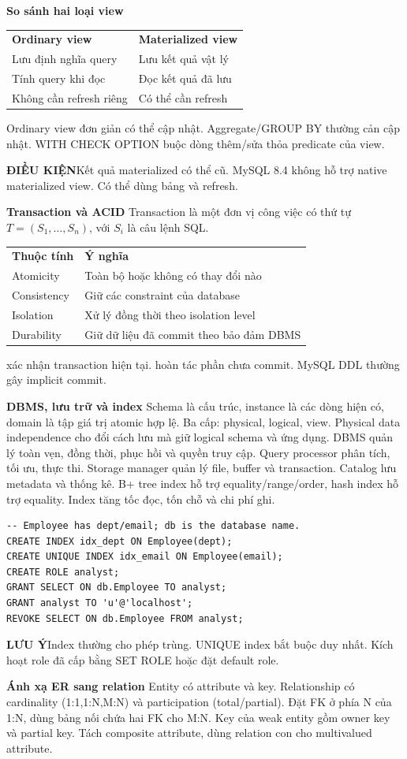 \documentclass[a4paper]{article}
\newcommand{\sqlfont}{\ttfamily}
\newcommand{\bodyfontsize}{5.55}
\newcommand{\bodyleading}{5.2}
\newcommand{\bodylineskiplimit}{-2pt}
\newcommand{\bodystyle}{%
  \fontsize{\bodyfontsize}{\bodyleading}\selectfont\setlength{\lineskiplimit}{\bodylineskiplimit}\RaggedRight
  \setlength{\abovedisplayskip}{.5pt}\setlength{\belowdisplayskip}{.5pt}%
  \setlength{\abovedisplayshortskip}{.3pt}\setlength{\belowdisplayshortskip}{.3pt}}
\newenvironment{topicblock}
  {\par\bodystyle}
  {\par}
\newcommand{\key}[1]{\par\textcolor{structure}{\textbf{#1}}\enspace}
\newcommand{\note}[4]{\par\nointerlineskip\vspace{.25pt}\begingroup\setlength{\fboxsep}{0.1pt}%
  \noindent\colorbox{#1}{\parbox{\dimexpr\linewidth-2\fboxsep\relax}{%
    \RaggedRight\textcolor{#2}{\textbf{#3}}\enspace #4}}%
  \endgroup\par\nointerlineskip\vspace{.25pt}}
\newcommand{\cond}[1]{\note{conditionbg}{condition}{ĐIỀU KIỆN}{#1}}
\newcommand{\trap}[1]{\note{warningbg}{warning}{LƯU Ý}{#1}}
\newcommand{\sql}[1]{{\sqlfont\color{sqltext}\detokenize{#1}}}
\newlength{\sheetwidth}
\newenvironment{sheetcolumns}[1]
  {\noindent\begin{minipage}[t]{#1\sheetwidth}\vspace{0pt}\bodystyle\ignorespaces}
  {\end{minipage}\par}
\begin{document}
\begin{sheetcolumns}{.258}
\begin{topicblock}
\key{So sánh hai loại view}
\par\begingroup\setlength{\tabcolsep}{1.4pt}
\begin{tabular}{@{}ll@{}}
\textbf{Ordinary view} & \textbf{Materialized view}\\
Lưu định nghĩa query & Lưu kết quả vật lý\\
Tính query khi đọc & Đọc kết quả đã lưu\\
Không cần refresh riêng & Có thể cần refresh
\end{tabular}\endgroup\par
Ordinary view đơn giản có thể cập nhật. Aggregate/GROUP BY thường cản cập nhật. WITH CHECK OPTION buộc dòng thêm/sửa thỏa predicate của view.
\cond{Kết quả materialized có thể cũ. MySQL 8.4 không hỗ trợ native materialized view. Có thể dùng bảng và refresh.}
\key{Transaction và ACID}
Transaction là một đơn vị công việc có thứ tự $T=(S_1,\ldots,S_n)$, với $S_i$ là câu lệnh SQL.
\par\begingroup\setlength{\tabcolsep}{1.4pt}
\begin{tabular}{@{}ll@{}}
\textbf{Thuộc tính} & \textbf{Ý nghĩa}\\
Atomicity & Toàn bộ hoặc không có thay đổi nào\\
Consistency & Giữ các constraint của database\\
Isolation & Xử lý đồng thời theo isolation level\\
Durability & Giữ dữ liệu đã commit theo bảo đảm DBMS
\end{tabular}\endgroup\par
\sql{COMMIT} xác nhận transaction hiện tại. \sql{ROLLBACK} hoàn tác phần chưa commit. MySQL DDL thường gây implicit commit.
\key{DBMS, lưu trữ và index}
Schema là cấu trúc, instance là các dòng hiện có, domain là tập giá trị atomic hợp lệ. Ba cấp: physical, logical, view. Physical data independence cho đổi cách lưu mà giữ logical schema và ứng dụng. DBMS quản lý toàn vẹn, đồng thời, phục hồi và quyền truy cập.
Query processor phân tích, tối ưu, thực thi. Storage manager quản lý file, buffer và transaction. Catalog lưu metadata và thống kê. B+ tree index hỗ trợ equality/range/order, hash index hỗ trợ equality. Index tăng tốc đọc, tốn chỗ và chi phí ghi.
\begin{lstlisting}
-- Employee has dept/email; db is the database name.
CREATE INDEX idx_dept ON Employee(dept);
CREATE UNIQUE INDEX idx_email ON Employee(email);
CREATE ROLE analyst;
GRANT SELECT ON db.Employee TO analyst;
GRANT analyst TO 'u'@'localhost';
REVOKE SELECT ON db.Employee FROM analyst;
\end{lstlisting}
\trap{Index thường cho phép trùng. UNIQUE index bắt buộc duy nhất. Kích hoạt role đã cấp bằng SET ROLE hoặc đặt default role.}
\key{Ánh xạ ER sang relation}
Entity có attribute và key. Relationship có cardinality (1:1,1:N,M:N) và participation (total/partial). Đặt FK ở phía N của 1:N, dùng bảng nối chứa hai FK cho M:N. Key của weak entity gồm owner key và partial key. Tách composite attribute, dùng relation con cho multivalued attribute.
\end{topicblock}


\end{sheetcolumns}
\end{document}
